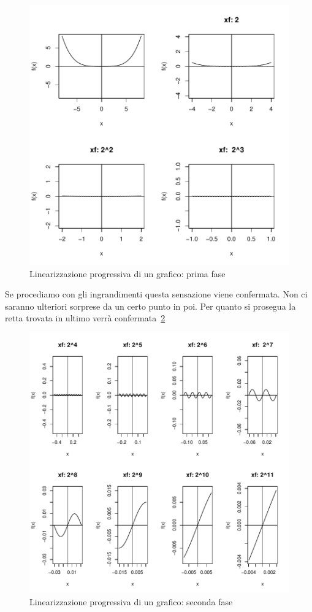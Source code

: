 \documentclass[onecolumn,11pt]{book}
\begin{document}
\begin{figure}
\includegraphics{statisticaconR-084}
\caption{Linearizzazione progressiva di un grafico: prima fase}
\label{fig:linear2}
\end{figure}

Se procediamo con gli ingrandimenti  questa sensazione viene confermata.
Non ci saranno ulteriori sorprese da un certo punto in poi. 
Per quanto si prosegua la retta trovata in ultimo verr\`a confermata~\ref{fig:linearizzazione4}

\begin{figure}[h]
\includegraphics{statisticaconR-085}
\caption{Linearizzazione progressiva di un grafico: seconda fase}
\label{fig:linearizzazione4}
\end{figure}
\end{document}
